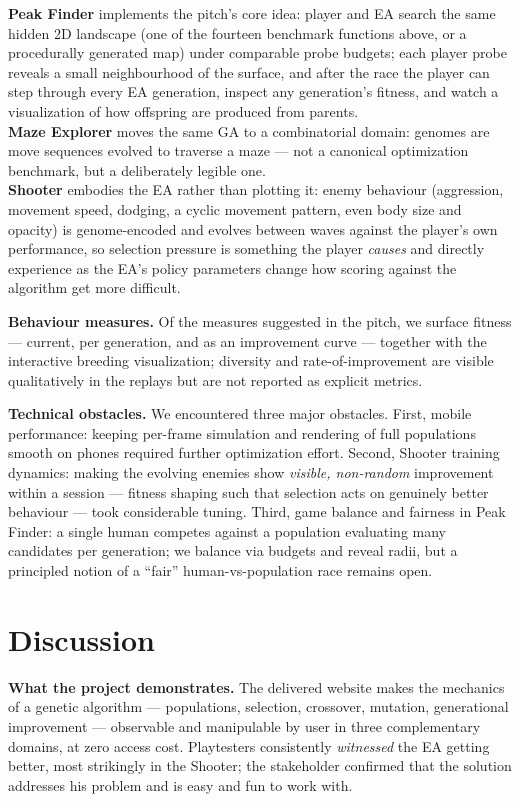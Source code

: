 \documentclass[conference]{IEEEtran}
\begin{document}
\textbf{Peak Finder} implements the pitch's core idea: player and EA search the same hidden 2D landscape (one of the fourteen benchmark functions above, or a procedurally generated map) under comparable probe budgets; each player probe reveals a small neighbourhood of the surface, and after the race the player can step through every EA generation, inspect any generation's fitness, and watch a visualization of how offspring are produced from parents.\\
\textbf{Maze Explorer} moves the same GA to a combinatorial domain: genomes are move sequences evolved to traverse a maze --- not a canonical optimization benchmark, but a deliberately legible one.\\
\textbf{Shooter} embodies the EA rather than plotting it: enemy behaviour (aggression, movement speed, dodging, a cyclic movement pattern, even body size and opacity) is genome-encoded and evolves between waves against the player's own performance, so selection pressure is something the player \emph{causes} and directly experience as the EA's policy parameters change how scoring against the algorithm get more difficult.

\textbf{Behaviour measures.} Of the measures suggested in the pitch, we surface fitness --- current, per generation, and as an improvement curve --- together with the interactive breeding visualization; diversity and rate-of-improvement are visible qualitatively in the replays but are not reported as explicit metrics.

\textbf{Technical obstacles.} We encountered three major obstacles. First, mobile performance: keeping per-frame simulation and rendering of full populations smooth on phones required further optimization effort. Second, Shooter training dynamics: making the evolving enemies show \emph{visible, non-random} improvement within a session --- fitness shaping such that selection acts on genuinely better behaviour --- took considerable tuning. Third, game balance and fairness in Peak Finder: a single human competes against a population evaluating many candidates per generation; we balance via budgets and reveal radii, but a principled notion of a ``fair'' human-vs-population race remains open.

\section{Discussion}
\label{sec:discussion}
\textbf{What the project demonstrates.} The delivered website makes the mechanics of a genetic algorithm --- populations, selection, crossover, mutation, generational improvement --- observable and manipulable by user in three complementary domains, at zero access cost. Playtesters consistently \emph{witnessed} the EA getting better, most strikingly in the Shooter; the stakeholder confirmed that the solution addresses his problem and is easy and fun to work with.
\end{document}
